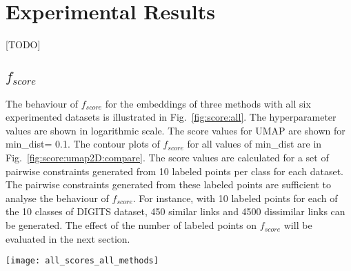 \section{Experimental Results}\label{sec:results}

[TODO]

\subsection{$f_{score}$}\label{sec:result:fscore}
The behaviour of $f_{score}$ for the embeddings of three methods with all six experimented datasets is illustrated in Fig.~\ref{fig:score:all}.
The hyperparameter values are shown in logarithmic scale.
The score values for UMAP are shown for {min\_dist= 0.1}.
The contour plots of $f_{score}$ for all values of {min\_dist} are in Fig.~\ref{fig:score:umap2D:compare}.
The score values are calculated for a set of pairwise constraints generated from 10 labeled points per class for each dataset.
The pairwise constraints generated from these labeled points are sufficient to analyse the behaviour of $f_{score}$.   
For instance, with 10 labeled points for each of the 10 classes of DIGITS dataset, 450 similar links and 4500 dissimilar links can be generated.
The effect of the number of labeled points on $f_{score}$ will be evaluated in the next section.

\begin{figure*}[ht!]
    \centering
    \texttt{[image: all\_scores\_all\_methods]}
    \caption{$f_{score}$ for all three methods for all six datasets.}
    \label{fig:score:all}
\end{figure*}

